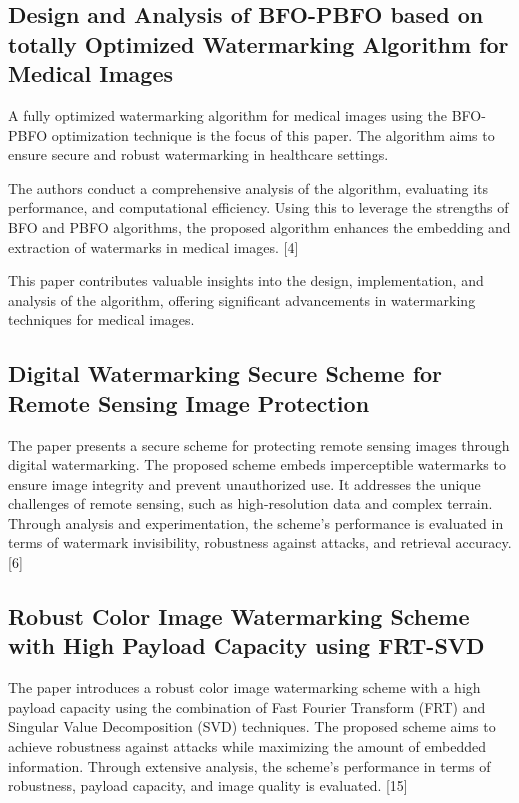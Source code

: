 \documentclass[conference]{IEEEtran}
\begin{document}
\subsection{Design and Analysis of BFO-PBFO based on totally Optimized Watermarking Algorithm for Medical Images}

A fully optimized watermarking algorithm for medical images using the BFO-PBFO optimization technique is the focus of this paper. The algorithm aims to ensure secure and robust watermarking in healthcare settings. 

The authors conduct a comprehensive analysis of the algorithm, evaluating its performance, and computational efficiency. Using this to leverage the strengths of BFO and PBFO algorithms, the proposed algorithm enhances the embedding and extraction of watermarks in medical images. [4]

This paper contributes valuable insights into the design, implementation, and analysis of the algorithm, offering significant advancements in watermarking techniques for medical images.


\subsection{Digital Watermarking Secure Scheme for Remote Sensing Image Protection}
The paper presents a secure scheme for protecting remote sensing images through digital watermarking. The proposed scheme embeds imperceptible watermarks to ensure image integrity and prevent unauthorized use. It addresses the unique challenges of remote sensing, such as high-resolution data and complex terrain. Through analysis and experimentation, the scheme's performance is evaluated in terms of watermark invisibility, robustness against attacks, and retrieval accuracy. [6]

\subsection{Robust Color Image Watermarking Scheme with High Payload Capacity using FRT-SVD}

The paper introduces a robust color image watermarking scheme with a high payload capacity using the combination of Fast Fourier Transform (FRT) and Singular Value Decomposition (SVD) techniques. The proposed scheme aims to achieve robustness against attacks while maximizing the amount of embedded information. Through extensive analysis, the scheme's performance in terms of robustness, payload capacity, and image quality is evaluated. [15]
\end{document}
